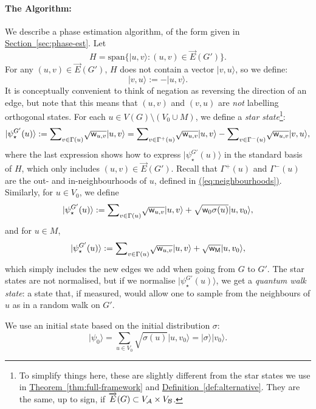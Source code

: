 \documentclass{article}
\newcommand{\eq}[1]{\hyperref[eq:#1]{(\ref*{eq:#1})}}
\renewcommand{\sec}[1]{\hyperref[sec:#1]{Section~\ref*{sec:#1}}}
\newcommand{\thm}[1]{\hyperref[thm:#1]{Theorem~\ref*{thm:#1}}}
\newcommand{\defin}[1]{\hyperref[def:#1]{Definition~\ref*{def:#1}}}
\def\ket#1{{\lvert}#1\rangle}
\renewcommand{\>}{\rangle}
\newcommand{\<}{\langle}
\renewcommand{\(}{\left(}
\renewcommand{\)}{\right)}
\def\w{{\sf w}}
\begin{document}
\paragraph{The Algorithm:} We describe a phase estimation algorithm, of the form given in \sec{phase-est}. Let 
$$H=\mathrm{span}\{\ket{u,v}:(u,v)\in\overrightarrow{E}(G')\}.$$
For any $(u,v)\in \overrightarrow{E}(G')$, $H$ does not contain a vector $\ket{v,u}$, so we define:
$$\ket{v,u} := -\ket{u,v}.$$
It is conceptually convenient to think of negation as reversing the direction of an edge, but note that this means that $(u,v)$ and $(v,u)$ are \emph{not} labelling orthogonal states. 
For each $u\in V(G)\setminus (V_0\cup M)$, we define a \emph{star state}\footnote{To simplify things here, these are slightly different from the star states we use in \thm{full-framework} and \defin{alternative}. They are the same, up to sign, if $\overrightarrow{E}(G)\subset V_{\cal A}\times V_{\cal B}$.}:
\begin{equation*}
\ket{\psi_\star^{G'}(u)}:=\textstyle{\displaystyle\sum}_{v\in\Gamma(u)}\sqrt{\w_{u,v}}\ket{u,v}=\textstyle{\displaystyle\sum}_{v\in\Gamma^+(u)}\sqrt{\w_{u,v}}\ket{u,v} - \textstyle{\displaystyle\sum}_{v\in\Gamma^-(u)}\sqrt{\w_{u,v}}\ket{v,u},
\end{equation*}
where the last expression shows how to express $\ket{\psi_\star^{G'}(u)}$ in the standard basis of $H$, which only includes $(u,v)\in\overrightarrow{E}(G')$. Recall that $\Gamma^+(u)$ and $\Gamma^-(u)$ are the out- and in-neighbourhoods of $u$, defined in \eq{neighbourhoods}.
Similarly, for $u\in V_0$, we define
\begin{equation*}
\ket{\psi_\star^{G'}(u)}:=\textstyle{\displaystyle\sum}_{v\in\Gamma(u)}\sqrt{\w_{u,v}}\ket{u,v}+\sqrt{\w_0\sigma(u)}\ket{u,v_0},
\end{equation*}
and for $u\in M$,
\begin{equation*}
\ket{\psi_\star^{G'}(u)}:=\textstyle{\displaystyle\sum}_{v\in\Gamma(u)}\sqrt{\w_{u,v}}\ket{u,v}+\sqrt{\w_{\sf M}}\ket{u,v_0},
\end{equation*}
which simply includes the new edges we add when going from $G$ to $G'$. The star states are not normalised, but if we normalise $\ket{\psi_\star^{G'}(u)}$, we get a \emph{quantum walk state}: a state that, if measured, would allow one to sample from the neighbours of $u$ as in a random walk on $G'$. 

We use an initial state based on the initial distribution $\sigma$:
$$\ket{\psi_0}=\textstyle{\displaystyle\sum}_{u\in V_0}\sqrt{\sigma(u)}\ket{u,v_0}=\ket{\sigma}\ket{v_0}.$$
\end{document}
